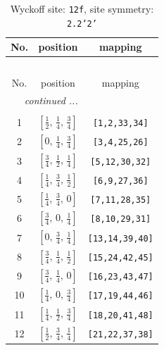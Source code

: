\documentclass[fleqn,8pt]{jsarticle}
\begin{document}
\begin{longtable}{ccc}
\caption{Wyckoff site: {\tt 12f}, site symmetry: {\tt 2.2'2'}}
 \\
 \hline \hline
No. & position & mapping \\ \hline \endfirsthead

\multicolumn{2}{l}{\tablename\ \thetable{}} \\
 \hline \hline
No. & position & mapping \\ \hline \endhead

 \hline \hline
\multicolumn{2}{r}{\footnotesize\it continued ...} \\ \endfoot

 \hline \hline
\multicolumn{2}{r}{} \\ \endlastfoot

1 & $\left[ \frac{1}{2},\, \frac{1}{4},\, \frac{3}{4} \right]$ & {\tt [1,2,33,34]} \\ \hline
2 & $\left[ 0,\, \frac{1}{4},\, \frac{3}{4} \right]$ & {\tt [3,4,25,26]} \\ \hline
3 & $\left[ \frac{3}{4},\, \frac{1}{2},\, \frac{1}{4} \right]$ & {\tt [5,12,30,32]} \\ \hline
4 & $\left[ \frac{1}{4},\, \frac{3}{4},\, \frac{1}{2} \right]$ & {\tt [6,9,27,36]} \\ \hline
5 & $\left[ \frac{1}{4},\, \frac{3}{4},\, 0 \right]$ & {\tt [7,11,28,35]} \\ \hline
6 & $\left[ \frac{3}{4},\, 0,\, \frac{1}{4} \right]$ & {\tt [8,10,29,31]} \\ \hline
7 & $\left[ 0,\, \frac{3}{4},\, \frac{1}{4} \right]$ & {\tt [13,14,39,40]} \\ \hline
8 & $\left[ \frac{3}{4},\, \frac{1}{4},\, \frac{1}{2} \right]$ & {\tt [15,24,42,45]} \\ \hline
9 & $\left[ \frac{3}{4},\, \frac{1}{4},\, 0 \right]$ & {\tt [16,23,43,47]} \\ \hline
10 & $\left[ \frac{1}{4},\, 0,\, \frac{3}{4} \right]$ & {\tt [17,19,44,46]} \\ \hline
11 & $\left[ \frac{1}{4},\, \frac{1}{2},\, \frac{3}{4} \right]$ & {\tt [18,20,41,48]} \\ \hline
12 & $\left[ \frac{1}{2},\, \frac{3}{4},\, \frac{1}{4} \right]$ & {\tt [21,22,37,38]} \\
\end{longtable}
\renewcommand{\arraystretch}{1.2}
\end{document}
